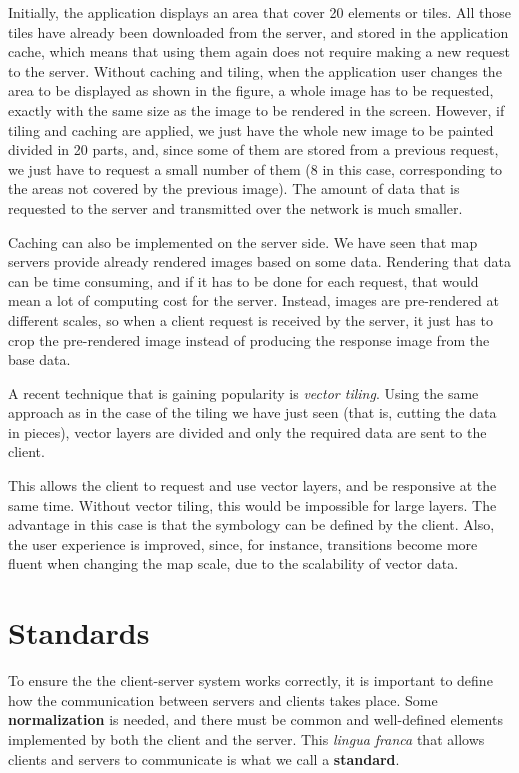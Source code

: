 Initially, the application displays an area that cover 20 elements or tiles. All those tiles have already been downloaded from the server, and stored in the application cache, which means that using them again does not require making a new request to the server. Without caching and tiling, when the application user changes the area to be displayed as shown in the figure, a whole image has to be requested, exactly with the same size as the image to be rendered in the screen. However, if tiling and caching are applied, we just have the whole new image to be painted divided in 20 parts, and, since some of them are stored from a previous request, we just have to request a small number of them (8 in this case, corresponding to the areas not covered by the previous image). The amount of data that is requested to the server and transmitted over the network is much smaller.

Caching can also be implemented on the server side. We have seen that map servers provide already rendered images based on some data. Rendering that data can be time consuming, and if it has to be done for each request, that would mean a lot of computing cost for the server. Instead, images are pre-rendered at different scales, so when a client request is received by the server, it just has to crop the pre-rendered image instead of producing the response image from the base data.

A recent technique that is gaining popularity is \emph{vector tiling}. Using the same approach as in the case of the tiling we have just seen (that is, cutting the data in pieces), vector layers are divided and only the required data are sent to the client.

This allows the client to request and use vector layers, and be responsive at the same time. Without vector tiling, this would be impossible for large layers. The advantage in this case is that the symbology can be defined by the client. Also, the user experience is improved, since, for instance, transitions become more fluent when changing the map scale, due to the scalability of vector data.




\section{Standards}

To ensure the the client-server system works correctly, it is important to define how the communication between servers and clients takes place. Some \textbf{normalization} is needed, and there must be common and well-defined elements implemented by both the client and the server. This \emph{lingua franca} that allows clients and servers to communicate is what we call a \textbf{standard}.

